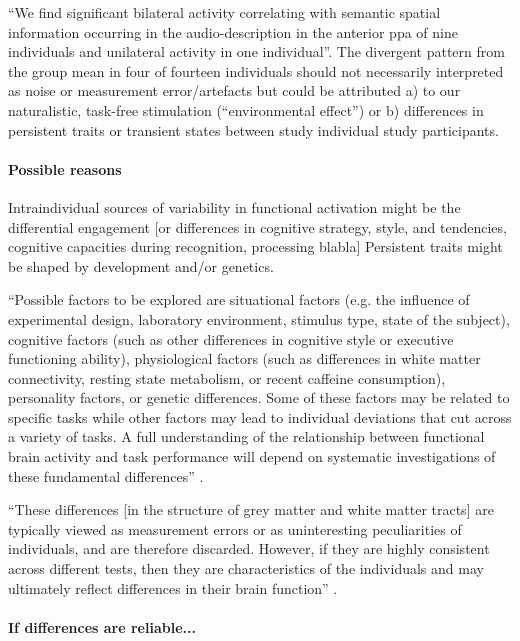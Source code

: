 ``We find significant bilateral activity correlating with semantic spatial
information occurring in the audio-description in the anterior \ac{ppa} of nine
individuals and unilateral activity in one individual''.
%
The divergent pattern from the group mean in four of fourteen individuals should
not necessarily interpreted as noise or measurement error/artefacts but could be
attributed a) to our naturalistic, task-free stimulation (``environmental
effect'') or b) differences in persistent traits or transient states between
study individual study participants.


\paragraph{Possible reasons}

%
Intraindividual sources of variability in functional activation might be the
differential engagement [or differences in cognitive strategy,
style, and tendencies, cognitive capacities during recognition, processing
blabla]
%
Persistent traits might be shaped by development and/or genetics.

%
``Possible factors to be explored are situational factors (e.g. the influence of
experimental design, laboratory environment, stimulus type, state of the
subject), cognitive factors (such as other differences in cognitive style or
executive functioning ability), physiological factors (such as differences in
white matter connectivity, resting state metabolism, or recent caffeine
consumption), personality factors, or genetic differences.
%
Some of these factors may be related to specific tasks while other factors may
lead to individual deviations that cut across a variety of tasks.
%
A full understanding of the relationship between functional brain activity and
task performance will depend on systematic investigations of these fundamental
differences'' \citep{vanhorn2008individual}.


``These differences [in the structure of grey matter and white matter tracts]
are typically viewed as measurement errors or as uninteresting peculiarities of
individuals, and are therefore discarded.
%
However, if they are highly consistent across different tests, then they are
characteristics of the individuals and may ultimately reflect differences in
their brain function'' \citep{kanai2011structural}.



\paragraph{If differences are reliable...}

